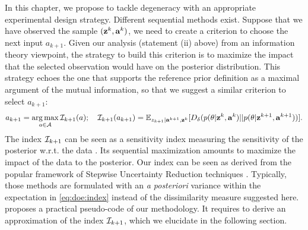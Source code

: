 In this chapter, we propose to tackle degeneracy with an appropriate experimental design strategy. 
Different sequential methods exist. Suppose that we have observed the sample $(\mathbf{z}^k,\mathbf{a}^k)$, we need to create a criterion to choose the next input $a_{k+1}$. 
Given our analysis (statement (ii) above) from an information theory viewpoint, the strategy to build this criterion is to maximize the impact that the selected observation would have on the posterior distribution. 
This strategy echoes the one that supports the reference prior definition as a maximal argument of the mutual information, so that we suggest a similar criterion to select $a_{k+1}$:
      \begin{equation}\label{eq:doe:index}
        a_{k+1}=\operatorname*{arg\,max}_{a\in\mathcal{A}}\mathcal{I}_{k+1}(a);\quad 
            \mathcal{I}_{k+1}(a_{k+1}) = \mathbb{E}_{{z_{k+1}}|\mathbf{a}^{k+1},\mathbf{z}^k}[D_\delta(p(\theta|\mathbf{z}^k,\mathbf{a}^k)||p(\theta|\mathbf{z}^{k+1},\mathbf{a}^{k+1}))].
    \end{equation}
The index $\mathcal{I}_{k+1}$ can be seen as a sensitivity index measuring the sensitivity of the posterior w.r.t. the data \citep{da_veiga_global_2015}. Its sequential maximization amounts to maximize the impact of the data to the posterior. %
Our index can be seen as derived from the popular framework of Stepwise Uncertainty Reduction techniques \citep{villemonteix_informational_2009}. %
Typically,  those methods are formulated with an \emph{a posteriori} variance within the expectation in \cref{eq:doe:index} instead of the dissimilarity measure suggested here.
 proposes a practical pseudo-code of our methodology. It requires to derive an approximation of the index $\mathcal{I}_{k+1}$, which we elucidate in the following section.





\renewcommand{\algorithmicrequire}{\textbf{Notations:}}

